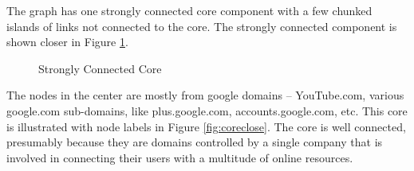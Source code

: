 \clearpage

The graph has one strongly connected core component with a few chunked islands of links not connected to the core. The strongly connected component is shown closer in Figure \ref{fig:core}.

\begin{figure}[h!]
\centering
{}
\caption{Strongly Connected Core}
\label{fig:core}
\end{figure}

The nodes in the center are mostly from google domains -- YouTube.com, various google.com sub-domains, like plus.google.com, accounts.google.com, etc. This core is illustrated with node labels in Figure \ref{fig:coreclose}. The core is well connected, presumably because they are domains controlled by a single company that is involved in connecting their users with a multitude of online resources. 

